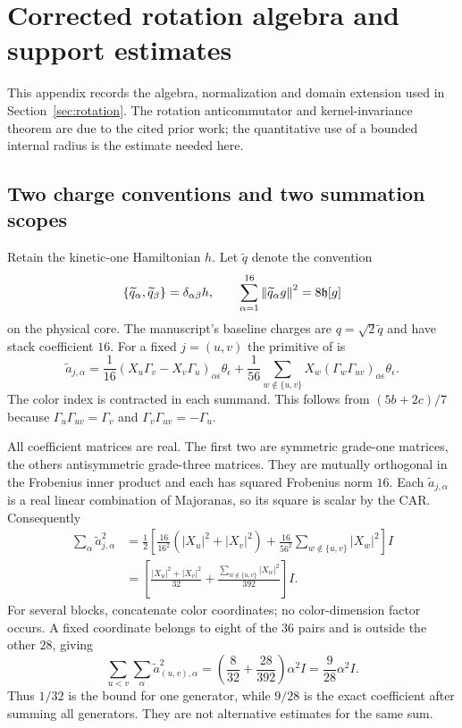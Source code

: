 \clearpage
\section{Corrected rotation algebra and support estimates}\label{app:rotation}
This appendix records the algebra, normalization and domain extension used in Section~\ref{sec:rotation}. The rotation anticommutator and kernel-invariance theorem are due to the cited prior work; the quantitative use of a bounded internal radius is the estimate needed here.

\subsection{Two charge conventions and two summation scopes}
Retain the kinetic-one Hamiltonian $h$. Let $\widetilde q$ denote the convention
\begin{equation}
 \{\widetilde q_\alpha,\widetilde q_\beta\}=\delta_{\alpha\beta}h,
 \qquad\sum_{\alpha=1}^{16}\left\lVert \widetilde q_\alpha g\right\rVert^2=8\mathfrak h[g]
\end{equation}
on the physical core. The manuscript's baseline charges are $q=\sqrt2\widetilde q$ and have stack coefficient $16$. For a fixed $j=(u,v)$ the primitive of \cite[Lemma 2(c)]{HHI} is
\begin{equation}
 \widetilde a_{j,\alpha}=\frac1{16}(X_u\Gamma_v-X_v\Gamma_u)_{\alpha\epsilon}\theta_\epsilon
 +\frac1{56}\sum_{w\notin\{u,v\}}X_w(\Gamma_w\Gamma_{uv})_{\alpha\epsilon}\theta_\epsilon.
 \label{eq:expandedprimitive}
\end{equation}
The color index is contracted in each summand. This follows from $(5b+2c)/7$ because $\Gamma_u\Gamma_{uv}=\Gamma_v$ and $\Gamma_v\Gamma_{uv}=-\Gamma_u$.

All coefficient matrices are real. The first two are symmetric grade-one matrices, the others antisymmetric grade-three matrices. They are mutually orthogonal in the Frobenius inner product and each has squared Frobenius norm $16$. Each $\widetilde a_{j,\alpha}$ is a real linear combination of Majoranas, so its square is scalar by the CAR. Consequently
\begin{align}
 \sum_\alpha\widetilde a_{j,\alpha}^2
 &=\frac12\left[\frac{16}{16^2}(|X_u|^2+|X_v|^2)
          +\frac{16}{56^2}\sum_{w\notin\{u,v\}}|X_w|^2\right]I\\
 &=\left[\frac{|X_u|^2+|X_v|^2}{32}
          +\frac{\sum_{w\notin\{u,v\}}|X_w|^2}{392}\right]I.
\end{align}
For several blocks, concatenate color coordinates; no color-dimension factor occurs. A fixed coordinate belongs to eight of the $36$ pairs and is outside the other $28$, giving
\begin{equation}
 \sum_{u<v}\sum_\alpha\widetilde a_{(u,v),\alpha}^2
 =\left(\frac8{32}+\frac{28}{392}\right)\alpha^2I
 =\frac9{28}\alpha^2I.\label{eq:allsum}
\end{equation}
Thus $1/32$ is the bound for one generator, while $9/28$ is the exact coefficient after summing all generators. They are not alternative estimates for the same sum.

